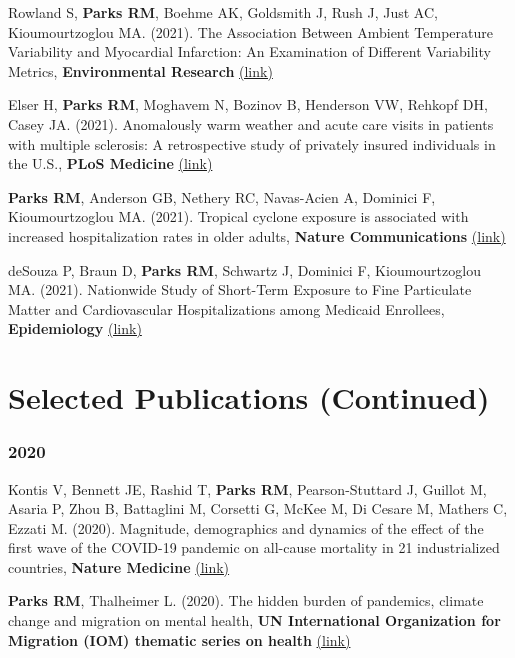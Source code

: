 \noindent Rowland S, \textbf{Parks RM}, Boehme AK, Goldsmith J, Rush J, Just AC, Kioumourtzoglou MA. (2021). The Association Between Ambient Temperature Variability and Myocardial Infarction: An Examination of Different Variability Metrics, \textbf{Environmental Research} \href{https://www.sciencedirect.com/science/article/pii/S0013935121005016}{(link)} \bigskip

\noindent Elser H, \textbf{Parks RM}, Moghavem N, Bozinov B, Henderson VW, Rehkopf DH, Casey JA. (2021). Anomalously warm weather and acute care visits in patients with multiple sclerosis: A retrospective study of privately insured individuals in the U.S., \textbf{PLoS Medicine} \href{https://journals.plos.org/plosmedicine/article?id=10.1371/journal.pmed.1003580}{(link)} \bigskip

\noindent \textbf{Parks RM}, Anderson GB, Nethery RC, Navas-Acien A, Dominici F, Kioumourtzoglou MA. (2021). Tropical cyclone exposure is associated with increased hospitalization rates in older adults, \textbf{Nature Communications} \href{https://www.nature.com/articles/s41467-021-21777-1}{(link)} \bigskip

\noindent deSouza P, Braun D, \textbf{Parks RM}, Schwartz J, Dominici F, Kioumourtzoglou MA. (2021). Nationwide Study of Short-Term Exposure to Fine Particulate Matter and Cardiovascular Hospitalizations among Medicaid Enrollees, \textbf{Epidemiology} \href{https://journals.lww.com/epidem/Abstract/2021/01000/Nationwide_Study_of_Short_term_Exposure_to_Fine.2.aspx}{(link)}

\newpage

\section*{Selected Publications (Continued)}

\subsubsection*{2020}

\noindent Kontis V, Bennett JE, Rashid T, \textbf{Parks RM}, Pearson-Stuttard J, Guillot M, Asaria P, Zhou B, Battaglini M, Corsetti G, McKee M, Di Cesare M, Mathers C, Ezzati M. (2020). Magnitude, demographics and dynamics of the effect of the first wave of the COVID-19 pandemic on all-cause mortality in 21 industrialized countries, \textbf{Nature Medicine} \href{https://doi.org/10.1038/s41591-020-1112-0}{(link)} \bigskip

\noindent \textbf{Parks RM}, Thalheimer L. (2020). The hidden burden of pandemics, climate change and migration on mental health, \textbf{UN International Organization for Migration (IOM) thematic series on health} \href{https://environmentalmigration.iom.int/blogs/hidden-burden-pandemics-climate-change-and-migration-mental-health}{(link)} \bigskip

